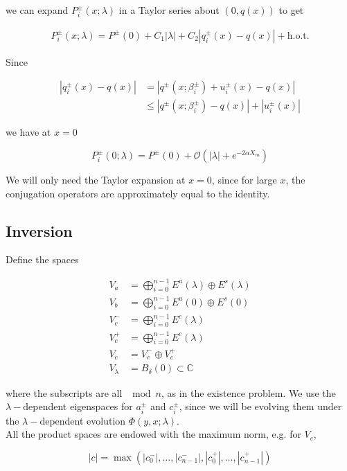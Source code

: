 \documentclass[12pt]{article}
\def\C{{\mathbb C}}
\begin{document}
we can expand $P_i^\pm(x; \lambda)$ in a Taylor series about $(0, q(x))$ to get

\begin{align*}
P_i^\pm(x; \lambda) = P^\pm(0) + C_1 |\lambda| 
+ C_2| q_i^\pm(x) - q(x) | + \text{h.o.t.}
\end{align*}

Since 

\begin{align*}
| q_i^\pm(x) - q(x) | &= | q^\pm(x; \beta_i^\pm) + u_i^\pm(x) - q(x) | \\
&\leq |q^\pm(x; \beta_i^\pm) - q(x)| + |u_i^\pm(x)|
\end{align*}

we have at $x = 0$

\begin{equation}\label{PTaylor}
P_i^\pm(0; \lambda) = P^\pm(0) + \mathcal{O}(|\lambda| + e^{-2 \alpha X_m})
\end{equation}

We will only need the Taylor expansion at $x = 0$, since for large $x$, the conjugation operators are approximately equal to the identity.

\subsection{Inversion}

Define the spaces

\begin{align*}
V_a &= \bigoplus_{i=0}^{n-1} E^u(\lambda) \oplus E^s(\lambda) \\
V_b &= \bigoplus_{i=0}^{n-1} E^u(0) \oplus E^s(0) \\
V_c^- &= \bigoplus_{i=0}^{n-1} E^c(\lambda) \\
V_c^+ &= \bigoplus_{i=0}^{n-1} E^c(\lambda) \\
V_c &= V_c^- \oplus V_c^+ \\
V_\lambda &= B_\delta(0) \subset \C
\end{align*}

where the subscripts are all $\mod n$, as in the existence problem. We use the $\lambda-$dependent eigenspaces for $a_i^\pm$ and $c_i^\pm$, since we will be evolving them under the $\lambda-$dependent evolution $\Phi(y, x; \lambda)$.\\

All the product spaces are endowed with the maximum norm, e.g. for $V_c$, 

\[
|c| = \max(|c_0^-|, \dots, |c_{n-1}^-|, |c_0^+|, \dots, |c_{n-1}^+|)
\]
\end{document}
